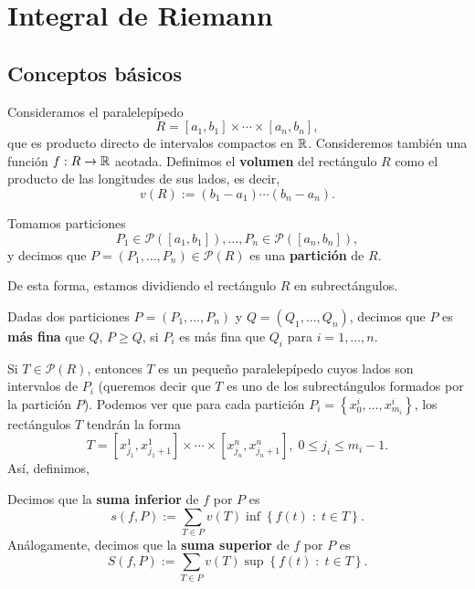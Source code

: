 \chapter{Integral de Riemann}
\section{Conceptos básicos}
Consideramos el paralelepípedo
\[R = [a_{1}, b_{1}] \times \cdots \times [a_{n}, b_{n}] ,\]
que es producto directo de intervalos compactos en $\displaystyle \mathbb{R} $. Consideremos también una función $\displaystyle f : R \to \mathbb{R} $ acotada. Definimos el \textbf{volumen} del rectángulo $\displaystyle R $ como el producto de las longitudes de sus lados, es decir,
\[v\left(R\right) := \left(b_{1}-a_{1}\right) \cdots \left(b_{n}-a_{n}\right) .\]
\begin{definition}[Partición]
Tomamos particiones
\[P_{1} \in \mathcal{P}\left([a_{1}, b_{1}]\right), \ldots, P_{n} \in \mathcal{P}\left([a_{n}, b_{n}]\right) ,\]
y decimos que $\displaystyle P = \left(P_{1}, \ldots, P_{n}\right) \in \mathcal{P}\left(R\right) $ es una \textbf{partición} de $\displaystyle R $.
\end{definition}
De esta forma, estamos dividiendo el rectángulo $\displaystyle R $ en subrectángulos.
\begin{definition}
Dadas dos particiones $\displaystyle P = \left(P_{1}, \ldots, P_{n}\right) $ y $\displaystyle Q = \left(Q_{1}, \ldots, Q_{n}\right) $, decimos que $\displaystyle P $ es \textbf{más fina} que $\displaystyle Q $, $\displaystyle P \geq Q $, si $\displaystyle P_{i} $ es más fina que $\displaystyle Q_{i} $ para $\displaystyle i = 1, \ldots, n $.
\end{definition}
 Si $\displaystyle T \in \mathcal{P}\left(R\right) $, entonces $\displaystyle T $ es un pequeño paralelepípedo cuyos lados son intervalos de $\displaystyle P_{i} $ (queremos decir que $\displaystyle T $ es uno de los subrectángulos formados por la partición $\displaystyle P $). Podemos ver que para cada partición $\displaystyle P_{i} = \left\{ x^{i}_{0}, \ldots, x^{i}_{m_{i}}\right\}  $, los rectángulos $\displaystyle T $ tendrán la forma  
\[ T = \left[x^{1}_{j_{1}}, x^{1}_{j_{1}+1}\right] \times \cdots \times \left[x^{n}_{j_{n}}, x^{n}_{j_{n}+1}\right], \; 0 \leq j_{i} \leq m_{i}-1.\]
Así, definimos,
\begin{definition}
Decimos que la \textbf{suma inferior} de $\displaystyle f $ por $\displaystyle P $ es
\[s\left(f, P\right) := \sum_{T \in P}v\left(T\right)\inf \left\{ f\left(t\right) \; : \; t \in T\right\} .\]
Análogamente, decimos que la \textbf{suma superior} de $\displaystyle f $ por $\displaystyle P $ es
\[S\left(f,P\right):=\sum_{T \in P}v\left(T\right)\sup \left\{ f\left(t\right) \; : \; t \in T\right\}  .\]
\end{definition}
